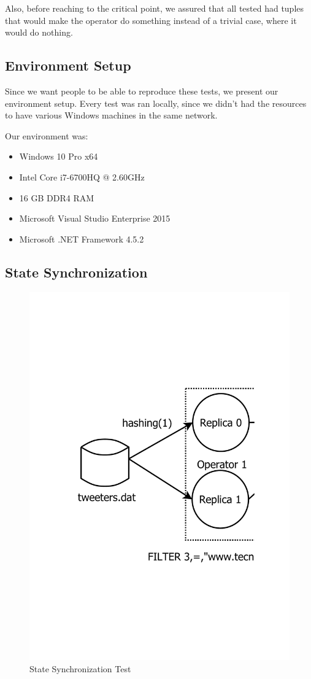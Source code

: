 \documentclass[times, 10pt,twocolumn]{article}
\begin{document}
Also, before reaching to the critical point, we assured that all tested had tuples that would make the operator do something instead of a trivial case, where it would do nothing.

\subsection{Environment Setup}
Since we want people to be able to reproduce these tests, we present our environment setup. Every test
was ran locally, since we didn't had the resources to have various Windows machines in the same network.

Our environment was:
\begin{itemize}
	\item Windows 10 Pro x64
	\item Intel Core i7-6700HQ @ 2.60GHz
	\item 16 GB DDR4 RAM
	\item Microsoft Visual Studio Enterprise 2015
	\item Microsoft .NET Framework 4.5.2
\end{itemize}
\subsection{State Synchronization}
\begin{figure}[h]
	\centering
	\includegraphics[scale=0.32]{"Tests/first"}
	\caption{State Synchronization Test} 
	\label{fig:state}
\end{figure}
	
\end{document}
